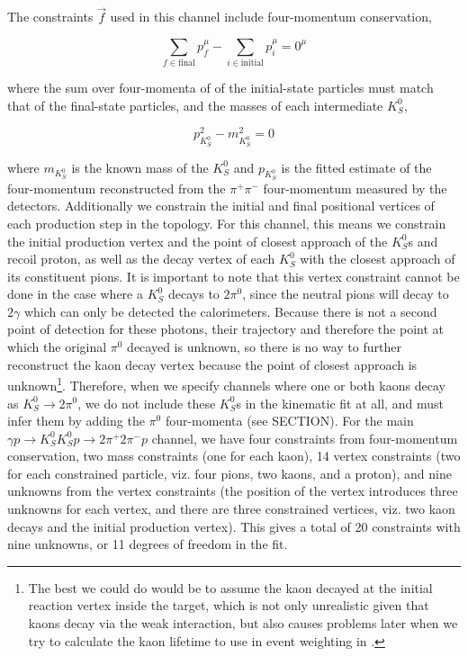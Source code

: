 The constraints $\vec{f}$ used in this channel include four-momentum conservation,

\begin{equation}
  \sum_{f\in\text{final}} p^\mu_{f} - \sum_{i\in\text{initial}} p^\mu_{i} = 0^\mu
\end{equation}

where the sum over four-momenta of of the initial-state particles must match that of the final-state particles, and the masses of each intermediate $K_S^0$,

\begin{equation}
  p_{K_S^0}^2 - m_{K_S^0}^2 = 0
\end{equation}

where $m_{K_S^0}$ is the known mass of the $K_S^0$ and $p_{K_S^0}$ is the fitted estimate of the four-momentum reconstructed from the $\pi^+\pi^-$ four-momentum measured by the detectors. Additionally we constrain the initial and final positional vertices of each production step in the topology. For this channel, this means we constrain the initial production vertex and the point of closest approach of the $K_S^0$s and recoil proton, as well as the decay vertex of each $K_S^0$ with the closest approach of its constituent pions. It is important to note that this vertex constraint cannot be done in the case where a $K_S^0$ decays to $2\pi^0$, since the neutral pions will decay to $2\gamma$ which can only be detected the calorimeters. Because there is not a second point of detection for these photons, their trajectory and therefore the point at which the original $\pi^0$ decayed is unknown, so there is no way to further reconstruct the kaon decay vertex because the point of closest approach is unknown\footnote{The best we could do would be to assume the kaon decayed at the initial reaction vertex inside the target, which is not only unrealistic given that kaons decay via the weak interaction, but also causes problems later when we try to calculate the kaon lifetime to use in event weighting in .}. Therefore, when we specify channels where one or both kaons decay as $K_S^0\to 2\pi^0$, we do not include these $K_S^0$s in the kinematic fit at all, and must infer them by adding the $\pi^0$ four-momenta (see {\color{red} SECTION}). For the main $\gamma p \to K_S^0K_S^0p \to 2\pi^+2\pi^-p$ channel, we have four constraints from four-momentum conservation, two mass constraints (one for each kaon), 14 vertex constraints (two for each constrained particle, viz. four pions, two kaons, and a proton), and nine unknowns from the vertex constraints (the position of the vertex introduces three unknowns for each vertex, and there are three constrained vertices, viz. two kaon decays and the initial production vertex). This gives a total of 20 constraints with nine unknowns, or 11 degrees of freedom in the fit.

